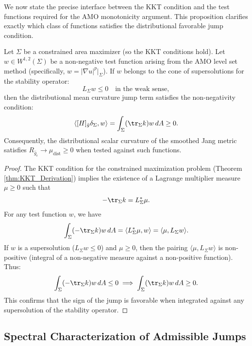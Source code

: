 We now state the precise interface between the KKT condition and the test functions required for the AMO monotonicity argument. This proposition clarifies exactly which class of functions satisfies the distributional favorable jump condition.

\begin{proposition}\label{prop:KKT_AMO_Interface}
Let $\Sigma$ be a constrained area maximizer (so the KKT conditions hold). Let $w \in W^{1,2}(\Sigma)$ be a non-negative test function arising from the AMO level set method (specifically, $w = |\nabla u|^p|_\Sigma$).
If $w$ belongs to the cone of supersolutions for the stability operator:
\begin{equation}
    L_\Sigma w \le 0 \quad \text{in the weak sense},
\end{equation}
then the distributional mean curvature jump term satisfies the non-negativity condition:
\begin{equation}
    \langle [H]_{\bar{g}} \delta_\Sigma, w \rangle = \int_\Sigma (\tr_\Sigma k) w \, dA \ge 0.
\end{equation}
Consequently, the distributional scalar curvature of the smoothed Jang metric satisfies $R_{\hat{g}_\epsilon} \to \mu_{\text{dist}} \ge 0$ when tested against such functions.
\end{proposition}

\begin{proof}
The KKT condition for the constrained maximization problem (Theorem \ref{thm:KKT_Derivation}) implies the existence of a Lagrange multiplier measure $\mu \ge 0$ such that
\[ -\tr_\Sigma k = L_\Sigma^* \mu. \]
For any test function $w$, we have
\[ \int_\Sigma (-\tr_\Sigma k) w \, dA = \langle L_\Sigma^* \mu, w \rangle = \langle \mu, L_\Sigma w \rangle. \]
If $w$ is a supersolution ($L_\Sigma w \le 0$) and $\mu \ge 0$, then the pairing $\langle \mu, L_\Sigma w \rangle$ is non-positive (integral of a non-negative measure against a non-positive function). Thus:
\[ \int_\Sigma (-\tr_\Sigma k) w \, dA \le 0 \implies \int_\Sigma (\tr_\Sigma k) w \, dA \ge 0. \]
This confirms that the sign of the jump is favorable when integrated against any supersolution of the stability operator.
\end{proof}

\subsection{Spectral Characterization of Admissible Jumps}

